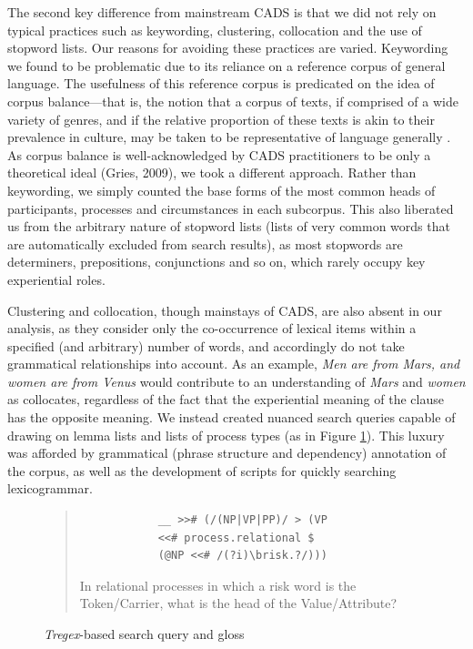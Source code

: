 		The second key difference from mainstream CADS is that we did not rely on typical practices such as keywording, clustering, collocation and the use of stopword lists. Our reasons for avoiding these practices are varied. Keywording we found to be problematic due to its reliance on a reference corpus of general language. The usefulness of this reference corpus is predicated on the idea of corpus balance---that is, the notion that a corpus of texts, if comprised of a wide variety of genres, and if the relative proportion of these texts is akin to their prevalence in culture, may be taken to be representative of language generally \cite{chen_sinica_1996}. As corpus balance is well-acknowledged by CADS practitioners to be only a theoretical ideal (Gries, 2009), we took a different approach. Rather than keywording, we simply counted the base forms of the most common heads of participants, processes and circumstances in each subcorpus. This also liberated us from the arbitrary nature of stopword lists (lists of very common words that are automatically excluded from search results), as most stopwords are determiners, prepositions, conjunctions and so on, which rarely occupy key experiential roles.

		Clustering and collocation, though mainstays of CADS, are also absent in our analysis, as they consider only the co-occurrence of lexical items within a specified (and arbitrary) number of words, and accordingly do not take grammatical relationships into account. As an example, \emph{Men are from Mars, and women are from Venus} would contribute to an understanding of \emph{Mars} and \emph{women} as collocates, regardless of the fact that the experiential meaning of the clause has the opposite meaning. We instead created nuanced search queries capable of drawing on lemma lists and lists of process types (as in Figure \ref{fig:glossed}). This luxury was afforded by grammatical (phrase structure and dependency) annotation of the corpus, as well as the development of scripts for quickly searching lexicogrammar.



			\begin{figure}
			\begin{quote}
			\begin{multicols}{2}
			\begin{verbatim}
			__ >># (/(NP|VP|PP)/ > (VP
			<<# process.relational $ 
			(@NP <<# /(?i)\brisk.?/)))
			\end{verbatim}
			\noindent In relational processes in which a risk word is the Token/Carrier, what is the head of the Value/Attribute?
			\end{multicols}
			\end{quote}
			\caption{\emph{Tregex}-based search query and gloss}
			\label{fig:glossed}
			\end{figure}

